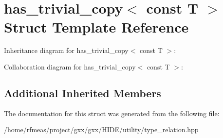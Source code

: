 \hypertarget{structhas__trivial__copy_3_01const_01T_01_4}{}\section{has\+\_\+trivial\+\_\+copy$<$ const T $>$ Struct Template Reference}
\label{structhas__trivial__copy_3_01const_01T_01_4}


Inheritance diagram for has\+\_\+trivial\+\_\+copy$<$ const T $>$\+:


Collaboration diagram for has\+\_\+trivial\+\_\+copy$<$ const T $>$\+:
\subsection*{Additional Inherited Members}


The documentation for this struct was generated from the following file\+:\begin{DoxyCompactItemize}
\item 
/home/rfmeas/project/gxx/gxx/\+H\+I\+D\+E/utility/type\+\_\+relation.\+hpp\end{DoxyCompactItemize}
